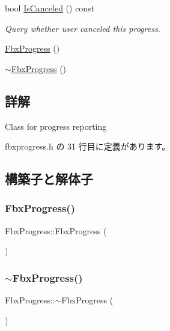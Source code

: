 \begin{DoxyCompactItemize}
bool \hyperlink{class_fbx_progress_a01a1707ca7bdb12250642661ac1a3a31}{Is\+Canceled} () const
\begin{DoxyCompactList}\small\item\em Query whether user canceled this progress. \end{DoxyCompactList}\item 
\hyperlink{class_fbx_progress_a9e3cb1977c2e11039314cc2be1020378}{Fbx\+Progress} ()
\item 
\hyperlink{class_fbx_progress_acb4d530f0f495e13e8db3bfb2382d9b7}{$\sim$\+Fbx\+Progress} ()
\end{DoxyCompactItemize}


\subsection{詳解}
Class for progress reporting 

 fbxprogress.\+h の 31 行目に定義があります。



\subsection{構築子と解体子}
\mbox{\label{class_fbx_progress_a9e3cb1977c2e11039314cc2be1020378}} 
\subsubsection{\texorpdfstring{Fbx\+Progress()}{FbxProgress()}}
{\footnotesize\ttfamily Fbx\+Progress\+::\+Fbx\+Progress (\begin{DoxyParamCaption}{ }\end{DoxyParamCaption})}

\mbox{\label{class_fbx_progress_acb4d530f0f495e13e8db3bfb2382d9b7}} 
\subsubsection{\texorpdfstring{$\sim$\+Fbx\+Progress()}{~FbxProgress()}}
{\footnotesize\ttfamily Fbx\+Progress\+::$\sim$\+Fbx\+Progress (\begin{DoxyParamCaption}{ }\end{DoxyParamCaption})}



